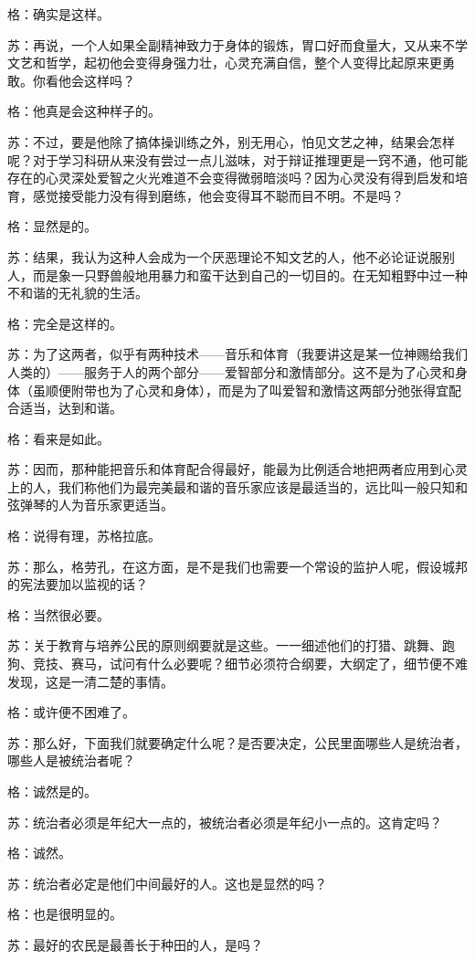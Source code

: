 \documentclass[11pt,oneside]{book}
\begin{document}
\begin{common-format}
格：确实是这样。

苏：再说，一个人如果全副精神致力于身体的锻炼，胃口好而食量大，又从来不学文艺和哲学，起初他会变得身强力壮，心灵充满自信，整个人变得比起原来更勇敢。你看他会这样吗？

格：他真是会这种样子的。

苏：不过，要是他除了搞体操训练之外，别无用心，怕见文艺之神，结果会怎样呢？对于学习科研从来没有尝过一点儿滋味，对于辩证推理更是一窍不通，他可能存在的心灵深处爱智之火光难道不会变得微弱暗淡吗？因为心灵没有得到启发和培育，感觉接受能力没有得到磨练，他会变得耳不聪而目不明。不是吗？

格：显然是的。

苏：结果，我认为这种人会成为一个厌恶理论不知文艺的人，他不必论证说服别人，而是象一只野兽般地用暴力和蛮干达到自己的一切目的。在无知粗野中过一种不和谐的无礼貌的生活。

格：完全是这样的。

苏：为了这两者，似乎有两种技术——音乐和体育（我要讲这是某一位神赐给我们人类的）——服务于人的两个部分——爱智部分和激情部分。这不是为了心灵和身体（虽顺便附带也为了心灵和身体），而是为了叫爱智和激情这两部分弛张得宜配合适当，达到和谐。

格：看来是如此。

苏：因而，那种能把音乐和体育配合得最好，能最为比例适合地把两者应用到心灵上的人，我们称他们为最完美最和谐的音乐家应该是最适当的，远比叫一般只知和弦弹琴的人为音乐家更适当。

格：说得有理，苏格拉底。

苏：那么，格劳孔，在这方面，是不是我们也需要一个常设的监护人呢，假设城邦的宪法要加以监视的话？

格：当然很必要。

苏：关于教育与培养公民的原则纲要就是这些。一一细述他们的打猎、跳舞、跑狗、竞技、赛马，试问有什么必要呢？细节必须符合纲要，大纲定了，细节便不难发现，这是一清二楚的事情。

格：或许便不困难了。

苏：那么好，下面我们就要确定什么呢？是否要决定，公民里面哪些人是统治者，哪些人是被统治者呢？

格：诚然是的。

苏：统治者必须是年纪大一点的，被统治者必须是年纪小一点的。这肯定吗？

格：诚然。

苏：统治者必定是他们中间最好的人。这也是显然的吗？

格：也是很明显的。

苏：最好的农民是最善长于种田的人，是吗？


\end{common-format}
\end{document}
